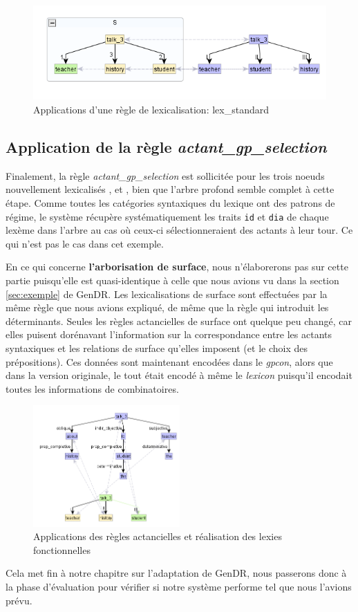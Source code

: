 \begin{figure}[htb]
	\centering
	\includegraphics[width=1\textwidth, trim = {0cm 0cm 0cm 0cm},clip]{ch6/figs/lex.png}
	\caption{Applications d'une règle de lexicalisation: lex\_standard}
	\label{deroulement3}
\end{figure}

\subsection{Application de la règle \emph{actant\_gp\_selection}}
Finalement, la règle \emph{actant\_gp\_selection} est sollicitée pour les trois noeuds nouvellement lexicalisés , et , bien que l'arbre profond semble complet à cette étape. Comme toutes les catégories syntaxiques du lexique ont des patrons de régime, le système récupère systématiquement les traits \texttt{id} et \texttt{dia} de chaque lexème dans l'arbre au cas où ceux-ci sélectionneraient des actants à leur tour. Ce qui n'est pas le cas dans cet exemple.

En ce qui concerne \textbf{l'arborisation de surface}, nous n'élaborerons pas sur cette partie puisqu'elle est quasi-identique à celle que nous avions vu dans la section \ref{sec:exemple} de GenDR. Les lexicalisations de surface sont effectuées par la même règle que nous avions expliqué, de même que la règle qui introduit les déterminants. Seules les règles actancielles de surface ont quelque peu changé, car elles puisent dorénavant l'information sur la correspondance entre les actants syntaxiques et les relations de surface qu'elles imposent (et le choix des prépositions). Ces données sont maintenant encodées dans le \emph{gpcon}, alors que dans la version originale, le tout était encodé à même le \emph{lexicon} puisqu'il encodait toutes les informations de combinatoires.

\begin{figure}[htb]
	\centering
	\includegraphics[width=0.5\textwidth, trim = {0cm 0cm 0cm 0cm},clip]{ch6/figs/ssynt.png}
	\caption{Applications des règles actancielles et réalisation des lexies fonctionnelles}
	\label{deroulement4}
\end{figure}

Cela met fin à notre chapitre sur l'adaptation de GenDR, nous passerons donc à la phase d'évaluation pour vérifier si notre système performe tel que nous l'avions prévu.